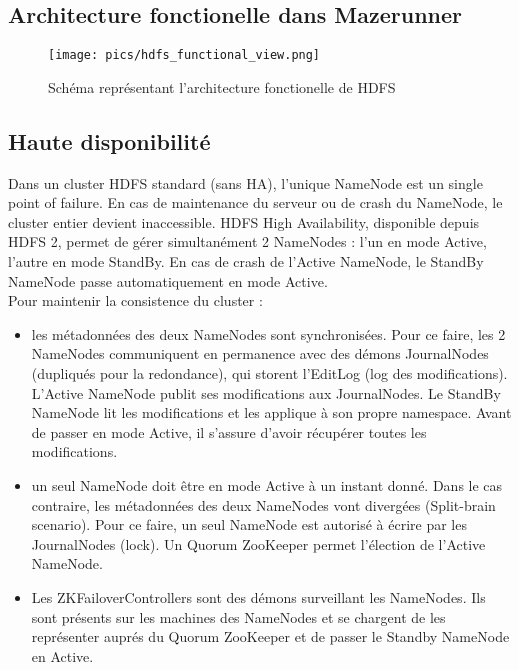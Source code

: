 \subsection{Architecture fonctionelle dans Mazerunner}

\begin{figure}[h]
    \centering
    \texttt{[image: pics/hdfs\_functional\_view.png]}
    \caption{Schéma représentant l'architecture fonctionelle de HDFS}
\end{figure}
\FloatBarrier

\subsection{Haute disponibilité}

Dans un cluster HDFS standard (sans HA), l'unique NameNode est un single point of failure. En cas de maintenance du serveur ou de crash du NameNode, le cluster entier devient inaccessible. HDFS High Availability, disponible depuis HDFS 2, permet de gérer simultanément 2 NameNodes : l'un en mode Active, l'autre en mode StandBy. En cas de crash de l'Active NameNode, le StandBy NameNode passe automatiquement en mode Active.\\

Pour maintenir la consistence du cluster :

\begin{itemize}
	\item les métadonnées des deux NameNodes sont synchronisées. Pour ce faire, les 2 NameNodes communiquent en permanence avec des démons JournalNodes (dupliqués pour la redondance), qui storent l'EditLog (log des modifications). L'Active NameNode publit ses modifications aux JournalNodes. Le StandBy NameNode lit les modifications et les applique à son propre namespace. Avant de passer en mode Active, il s'assure d'avoir récupérer toutes les modifications.
	\item un seul NameNode doit être en mode Active à un instant donné. Dans le cas contraire, les métadonnées des deux NameNodes vont divergées (Split-brain scenario). Pour ce faire, un seul NameNode est autorisé à écrire par les JournalNodes (lock). Un Quorum ZooKeeper permet l'élection de l'Active NameNode.
	\item Les ZKFailoverControllers sont des démons surveillant les NameNodes. Ils sont présents sur les machines des NameNodes et se chargent de les représenter auprés du Quorum ZooKeeper et de passer le Standby NameNode en Active.
\end{itemize}

